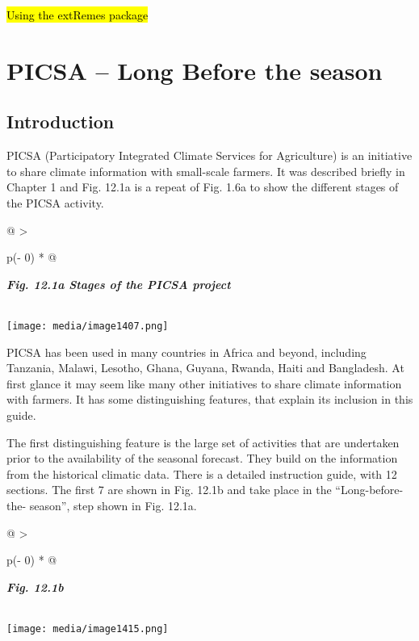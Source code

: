 \documentclass[
  letterpaper,
  DIV=11,
  numbers=noendperiod]{scrreprt}
\begin{document}
\hl{Using the extRemes package}


\chapter{PICSA -- Long Before the
season}\label{picsa-long-before-the-season}

\section{Introduction}\label{introduction-11}

PICSA (Participatory Integrated Climate Services for Agriculture) is an
initiative to share climate information with small-scale farmers. It was
described briefly in Chapter 1 and Fig. 12.1a is a repeat of Fig. 1.6a
to show the different stages of the PICSA activity.

\begin{longtable}[]{@{}
  >{\raggedright\arraybackslash}p{(\columnwidth - 0\tabcolsep) * }@{}}
\toprule\noalign{}
\begin{minipage}[b]{\linewidth}\raggedright
\textbf{\emph{Fig. 12.1a Stages of the PICSA project}}
\end{minipage} \\
\midrule\noalign{}
\endhead
\bottomrule\noalign{}
\endlastfoot
\texttt{[image: media/image1407.png]} \\
\end{longtable}

PICSA has been used in many countries in Africa and beyond, including
Tanzania, Malawi, Lesotho, Ghana, Guyana, Rwanda, Haiti and Bangladesh.
At first glance it may seem like many other initiatives to share climate
information with farmers. It has some distinguishing features, that
explain its inclusion in this guide.

The first distinguishing feature is the large set of activities that are
undertaken prior to the availability of the seasonal forecast. They
build on the information from the historical climatic data. There is a
detailed instruction guide, with 12 sections. The first 7 are shown in
Fig. 12.1b and take place in the ``Long-before-the- season'', step shown
in Fig. 12.1a.

\begin{longtable}[]{@{}
  >{\raggedright\arraybackslash}p{(\columnwidth - 0\tabcolsep) * }@{}}
\toprule\noalign{}
\begin{minipage}[b]{\linewidth}\raggedright
\textbf{\emph{Fig. 12.1b}}
\end{minipage} \\
\midrule\noalign{}
\endhead
\bottomrule\noalign{}
\endlastfoot
\texttt{[image: media/image1415.png]} \\
\end{longtable}
\end{document}
